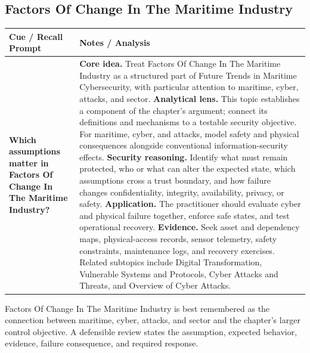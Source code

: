 \documentclass[11pt]{article}
\newcommand{\CornellHeader}{%
\rowcolor{Navy}\color{white}\bfseries Cue / Recall Prompt & \color{white}\bfseries Notes / Analysis\\\hline}
\newcommand{\CornellRow}[2]{%
\cellcolor{CueGray}\RaggedRight\textbf{#1} & \RaggedRight #2\\\hline}
\begin{document}
\subsection*{Factors Of Change In The Maritime Industry}
\begin{longtable}{>{\RaggedRight\arraybackslash}p{}|>{\RaggedRight\arraybackslash}p{}}
\CornellHeader
\CornellRow{Which assumptions matter in Factors Of Change In The Maritime Industry?}{\textbf{Core idea.} Treat Factors Of Change In The Maritime Industry as a structured part of Future Trends in Maritime Cybersecurity, with particular attention to maritime, cyber, attacks, and sector. \textbf{Analytical lens.} This topic establishes a component of the chapter's argument; connect its definitions and mechanisms to a testable security objective. For maritime, cyber, and attacks, model safety and physical consequences alongside conventional information-security effects. \textbf{Security reasoning.} Identify what must remain protected, who or what can alter the expected state, which assumptions cross a trust boundary, and how failure changes confidentiality, integrity, availability, privacy, or safety. \textbf{Application.} The practitioner should evaluate cyber and physical failure together, enforce safe states, and test operational recovery. \textbf{Evidence.} Seek asset and dependency maps, physical-access records, sensor telemetry, safety constraints, maintenance logs, and recovery exercises. Related subtopics include Digital Transformation, Vulnerable Systems and Protocols, Cyber Attacks and Threats, and Overview of Cyber Attacks.}
\end{longtable}
\begin{topicsummary}
Factors Of Change In The Maritime Industry is best remembered as the connection between maritime, cyber, attacks, and sector and the chapter's larger control objective. A defensible review states the assumption, expected behavior, evidence, failure consequence, and required response.
\end{topicsummary}
\end{document}
